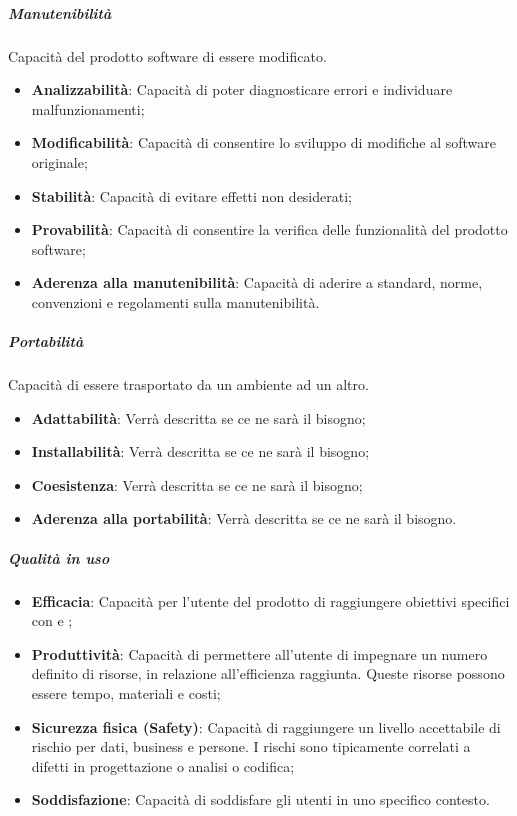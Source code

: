 \subparagraph{Manutenibilità}
Capacità del prodotto software di essere modificato.
\begin{itemize}
\item \textbf{Analizzabilità}: Capacità di poter diagnosticare errori e individuare malfunzionamenti;
\item \textbf{Modificabilità}: Capacità di consentire lo sviluppo di modifiche al software originale;
\item \textbf{Stabilità}: Capacità di evitare effetti non desiderati;
\item \textbf{Provabilità}: Capacità di consentire la verifica delle funzionalità del prodotto software;
\item \textbf{Aderenza alla manutenibilità}: Capacità di aderire a standard, norme, convenzioni e regolamenti sulla manutenibilità.
\end{itemize}

\subparagraph{Portabilità}
Capacità di essere trasportato da un ambiente ad un altro.
\begin{itemize}
\item \textbf{Adattabilità}: Verrà descritta se ce ne sarà il bisogno;
\item \textbf{Installabilità}: Verrà descritta se ce ne sarà il bisogno;
\item \textbf{Coesistenza}: Verrà descritta se ce ne sarà il bisogno;
\item \textbf{Aderenza alla portabilità}: Verrà descritta se ce ne sarà il bisogno.
\end{itemize}

\subparagraph{Qualità in uso}
\begin{itemize}
\item \textbf{Efficacia}: Capacità per l'utente del prodotto di raggiungere obiettivi specifici con  e ;
\item \textbf{Produttività}: Capacità di permettere all’utente di impegnare un numero definito di risorse, in relazione all’efficienza raggiunta. Queste risorse possono essere tempo, materiali e costi;
\item \textbf{Sicurezza fisica (Safety)}: Capacità di raggiungere un livello accettabile di rischio per dati, business e persone. I rischi sono tipicamente correlati a difetti in progettazione o analisi o codifica;
\item \textbf{Soddisfazione}: Capacità di soddisfare gli utenti in uno specifico contesto.
\end{itemize}